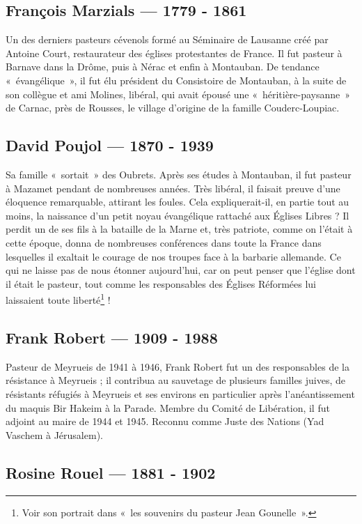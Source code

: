 \subsection{François Marzials --- 1779 - 1861}

Un des derniers pasteurs cévenols formé au Séminaire de Lausanne créé par Antoine
Court, restaurateur des églises protestantes de France. Il fut pasteur à Barnave dans
la Drôme, puis à Nérac et enfin à Montauban. De tendance «~évangélique~», il fut élu
président du Consistoire de Montauban, à la suite de son collègue et ami Molines,
libéral, qui avait épousé une «~héritière-paysanne~» de Carnac, près de Rousses, le
village d’origine de la famille Couderc-Loupiac.

\subsection{David Poujol --- 1870 - 1939}

Sa famille «~sortait~» des Oubrets. Après ses études à Montauban, il fut pasteur à
Mazamet pendant de nombreuses années. Très libéral, il faisait preuve d’une
éloquence remarquable, attirant les foules. Cela expliquerait-il, en partie tout au
moins, la naissance d’un petit noyau évangélique rattaché aux Églises Libres ?
Il perdit un de ses fils à la bataille de la Marne et, très patriote, comme on l’était à
cette époque, donna de nombreuses conférences dans toute la France dans lesquelles
il exaltait le courage de nos troupes face à la barbarie allemande. Ce qui ne laisse pas
de nous étonner aujourd’hui, car on peut penser que l’église dont il était le pasteur,
tout comme les responsables des Églises Réformées lui laissaient toute liberté\footnote{Voir son portrait dans «~les souvenirs du pasteur Jean Gounelle~».} !


\subsection{Frank Robert --- 1909 - 1988}

Pasteur de Meyrueis de 1941 à 1946, Frank Robert fut un des responsables de la
résistance à Meyrueis ; il contribua au sauvetage de plusieurs familles juives, de
résistants réfugiés à Meyrueis et ses environs en particulier après l’anéantissement
du maquis Bir Hakeim à la Parade.
Membre du Comité de Libération, il fut adjoint au maire de 1944 et 1945.
Reconnu comme Juste des Nations (Yad Vaschem à Jérusalem).

\subsection{Rosine Rouel --- 1881 - 1902}

